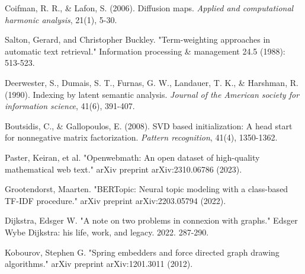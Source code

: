 \documentclass[12pt,a4paper]{article}
\begin{document}
\begin{thebibliography}{9}

Coifman, R. R., \& Lafon, S. (2006). Diffusion maps. \textit{Applied and computational harmonic analysis}, 21(1), 5-30.

Salton, Gerard, and Christopher Buckley. "Term-weighting approaches in automatic text retrieval." Information processing \& management 24.5 (1988): 513-523.

Deerwester, S., Dumais, S. T., Furnas, G. W., Landauer, T. K., \& Harshman, R. (1990). Indexing by latent semantic analysis. \textit{Journal of the American society for information science}, 41(6), 391-407.

Boutsidis, C., \& Gallopoulos, E. (2008). SVD based initialization: A head start for nonnegative matrix factorization. \textit{Pattern recognition}, 41(4), 1350-1362.

Paster, Keiran, et al. "Openwebmath: An open dataset of high-quality mathematical web text." arXiv preprint arXiv:2310.06786 (2023).

Grootendorst, Maarten. "BERTopic: Neural topic modeling with a class-based TF-IDF procedure." arXiv preprint arXiv:2203.05794 (2022).

Dijkstra, Edsger W. "A note on two problems in connexion with graphs." Edsger Wybe Dijkstra: his life, work, and legacy. 2022. 287-290.

Kobourov, Stephen G. "Spring embedders and force directed graph drawing algorithms." arXiv preprint arXiv:1201.3011 (2012).

\end{thebibliography}
\end{document}
